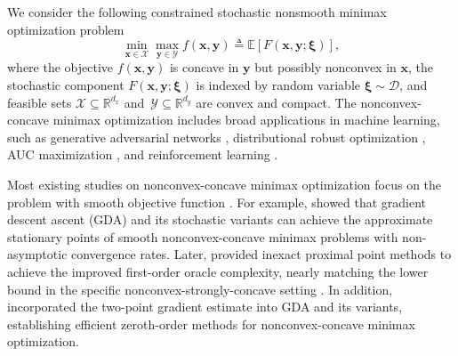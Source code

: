 \documentclass[11pt]{article}
\def\vx{\mathbf{x}}
\def\vy{\mathbf{y}}
\def\vxi{\bm{\xi}}
\def\fD{{\mathcal{D}}}
\def\fX{{\mathcal{X}}}
\def\fY{{\mathcal{Y}}}
\def\BR{{\mathbb{R}}}
\begin{document}
We consider the following constrained stochastic nonsmooth minimax optimization problem
\begin{equation}\label{prob:constrained main}
\min_{\vx\in\mathcal{X}}\max_{\vy\in\mathcal{Y}}f(\vx,\vy)\triangleq\mathbb{E}[F(\vx,\vy;\vxi)],
\end{equation}
where the objective $f(\vx,\vy)$ is concave in $\vy$ but possibly nonconvex in $\vx$, the stochastic component $F(\vx,\vy;\vxi)$ is indexed by random variable $\vxi\sim\fD$, and feasible sets $\fX\subseteq\BR^{d_x}$ and~$\fY\subseteq\BR^{d_y}$ are convex and compact. 
The nonconvex-concave minimax optimization includes broad applications in machine learning, such as generative adversarial networks \citep{goodfellow2014generative,arjovsky2017wasserstein}, distributional robust optimization \citep{rahimian2019distributionally,jin2021non,sinha2017certifying,levy2020large,gao2023distributionally,biggio2012poisoning}, AUC maximization \citep{guo2023fast,liu2019stochastic,yuan2021federated,zhang2023federated}, and reinforcement learning \citep{jin2020efficiently,qiu2020single,wai2018multi,zhang2019policy}.

Most existing studies on nonconvex-concave minimax optimization focus on the problem with smooth objective function \citep{lin2020gradient,jin2020local,thekumparampil2019efficient,zhang2021complexity,lin2020near,lu2020hybrid,chen2021cubic,rafique2022weakly,huang2022accelerated,luo2022finding,luo2020stochastic,xu2023unified,xu2024derivative,wang2024efficient,yang2023accelerating,li2021complexity,zhang2020single,mahdavinia2022tight}. 
For example, \citet{lin2020gradient} showed that gradient descent ascent (GDA) and its stochastic variants can achieve the approximate stationary points of smooth nonconvex-concave minimax problems with non-asymptotic convergence rates.  
Later, \citet{lin2020near} provided inexact proximal point methods to achieve the improved first-order oracle complexity, nearly matching the lower bound in the specific nonconvex-strongly-concave setting \citep{zhang2021complexity,li2021complexity}.
In addition, \citet{xu2024derivative,huang2022accelerated,wang2023zeroth,xu2020gradient} incorporated the two-point gradient estimate \citep{nesterov2017random} into GDA and its variants, establishing efficient zeroth-order methods for  nonconvex-concave minimax optimization.
\end{document}
